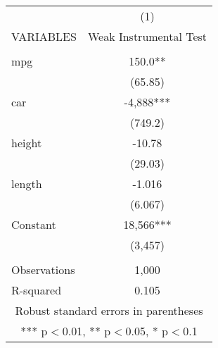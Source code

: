 \documentclass[]{article}
\begin{document}
\begin{tabular}{lc} \hline
 & (1) \\
VARIABLES & Weak Instrumental Test \\ \hline
 &  \\
mpg & 150.0** \\
 & (65.85) \\
car & -4,888*** \\
 & (749.2) \\
height & -10.78 \\
 & (29.03) \\
length & -1.016 \\
 & (6.067) \\
Constant & 18,566*** \\
 & (3,457) \\
 &  \\
Observations & 1,000 \\
 R-squared & 0.105 \\ \hline
\multicolumn{2}{c}{ Robust standard errors in parentheses} \\
\multicolumn{2}{c}{ *** p$<$0.01, ** p$<$0.05, * p$<$0.1} \\
\end{tabular}
\end{document}
